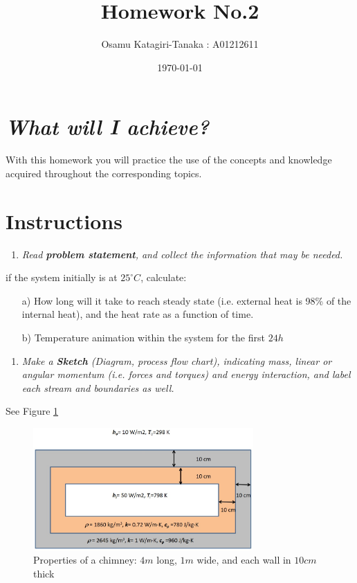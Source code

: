 \documentclass{article}
\title{Homework No.2}
\author{Osamu Katagiri-Tanaka : A01212611}
\date{\today}
\begin{document}
\maketitle

\section*{\emph{What will I achieve?}}
With this homework you will practice the use of the concepts and knowledge acquired throughout the corresponding topics.

\section*{Instructions}

\begin{enumerate}
\item \textit{Read \textbf{problem statement}, and collect the information that may be needed.}
\end{enumerate}

if the system initially is at $25^\circ C$, calculate:
\begin{itemize}
\item[a)] How long will it take to reach steady state (i.e. external heat is 98\% of the internal heat), and the heat rate as a function of time.
\item[b)] Temperature animation within the system for the first $24h$
\end{itemize}

\begin{enumerate}[resume]
\item \textit{Make a \textbf{Sketch} (Diagram, process flow chart), indicating mass, linear or angular momentum (i.e. forces and torques) and energy interaction, and label each stream and boundaries as well.}
\end{enumerate}

See Figure \ref{fig_SKETCH}

\begin{figure}[h!]
\centering
\includegraphics[width=0.75\textwidth]{./img/SKETCH.png}
\caption{Properties of a chimney: $4m$ long, $1m$ wide, and each wall in $10cm$ thick}
\label{fig_SKETCH}
\end{figure}
\end{document}
